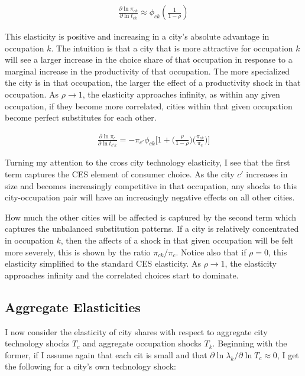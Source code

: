 \documentclass[10pt]{article}
\begin{document}
\begin{align}
    \frac{\partial \ln \pi_{ck}}{\partial \ln t_{ck}} \approx \phi_{ck} \left( \frac{1}{1 - \rho} \right)
    \label{co_own_elasticity}
\end{align}

This elasticity is positive and increasing in a city's absolute advantage in occupation $k$. The intuition is that a city that is more attractive for occupation $k$ will see a larger increase in the choice share of that occupation in response to a marginal increase in the productivity of that occupation. The more specialized the city is in that occupation, the larger the effect of a productivity shock in that occupation. As $\rho \rightarrow 1$, the elasticity approaches infinity, as within any given occupation, if they become more correlated, cities within that given occupation become perfect substitutes for each other.

\begin{align}
    \frac{\partial\ln{\pi_{c}}}{\partial\ln{t_{{c'}k}}} = -{\pi_{c'}}{\phi_{ck}}\Big[1+\Big(\frac{\rho}{1-\rho}\Big)\Big(\frac{\pi_{ck}}{\pi_{c}}\Big)\Big]
    \label{co_cross_elasticity}
\end{align}

Turning my attention to the cross city technology elasticity, I see that the first term captures the CES element of consumer choice. As the city $c'$ increases in size and becomes increasingly competitive in that occupation, any shocks to this city-occupation pair will have an increasingly negative effects on all other cities.

How much the other cities will be affected is captured by the second term which captures the unbalanced substitution patterns. If a city is relatively concentrated in occupation $k$, then the affects of a shock in that given occupation will be felt more severely, this is shown by the ratio $\pi_{ck} / \pi_c$. Notice also that if $\rho = 0$, this elasticity simplified to the standard CES elasticity. As $\rho \rightarrow 1$, the elasticity approaches infinity and the correlated choices start to dominate.

\subsection{Aggregate Elasticities}

I now consider the elasticity of city shares with respect to aggregate city technology shocks $T_c$ and aggregate occupation shocks $T_k$. Beginning with the former, if I assume again that each cit is small and that $\partial \ln \lambda_k / \partial \ln T_c \approx 0$, I get the following for a city's own technology shock:
\end{document}
